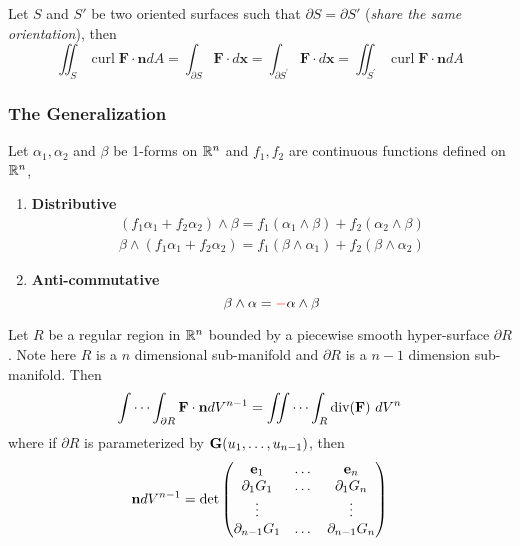 \documentclass[11pt]{article}
\begin{document}
			\begin{theorem}
				Let $S$ and $S'$ be two oriented surfaces such that $\partial S = \partial S'$ (\emph{share the same orientation}), then 
				\begin{equation}
					\iint_{S} \operatorname{curl} \mathbf{F} \cdot \mathbf{n} d A=\int_{\partial S} \mathbf{F} \cdot d \mathbf{x}=\int_{\partial S^{\prime}} \mathbf{F} \cdot d \mathbf{x}=\iint_{S^{\prime}} \operatorname{curl} \mathbf{F} \cdot \mathbf{n} d A
				\end{equation}
			\end{theorem}
			
		\subsubsection{The Generalization}
			\begin{proposition} Let $\alpha_1, \alpha_2$ and $\beta$ be 1-forms on $\mathbb{R}^n$ and $f_1, f_2$ are continuous functions defined on $\mathbb{R}^n$,
				\begin{enumerate}
					\item \textbf{Distributive}
					\begin{gather}
						(f_1 \alpha_1 + f_2 \alpha_2) \land \beta = f_1(\alpha_1 \land \beta) + f_2 (\alpha_2 \land \beta) \\
						\beta \land (f_1 \alpha_1 + f_2 \alpha_2) = f_1 (\beta \land \alpha_1) + f_2 (\beta \land \alpha_2)
					\end{gather}
					\item \textbf{Anti-commutative}
					\begin{equation}
						\beta \land \alpha = \textcolor{red}{-} \alpha \land \beta
					\end{equation}
				\end{enumerate}
			\end{proposition}
			
			\begin{theorem}
				Let $R$ be a regular region in $\mathbb{R}^n$ bounded by a piecewise smooth hyper-surface $\partial R$. Note here $R$ is a $n$ dimensional sub-manifold and $\partial R$ is a $n-1$ dimension sub-manifold. Then
				\begin{gather}
					\idotsint_{\partial R} \textbf{F} \cdot \textbf{n} dV^{n-1} = \iint \cdots \int_R \text{div}(\textbf{F})\ dV^n
				\end{gather}
				where if $\partial R$ is parameterized by $\textbf{G}(u_1, \dots, u_{n-1})$, then
				\begin{gather}
					\textbf{n}dV^{n-1} = \det \begin{pmatrix}
						\textbf{e}_1 & \dots & \textbf{e}_n \\
						\partial_1 G_1 & \dots & \partial_1 G_n \\
						\vdots & & \vdots \\
						\partial_{n-1} G_1 & \dots & \partial_{n-1} G_n
					\end{pmatrix}
				\end{gather}
			\end{theorem}
			
\end{document}
